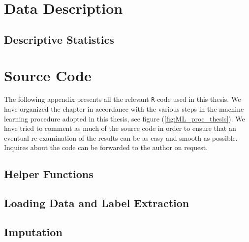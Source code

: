 \documentclass[../thesis.tex]{subfiles}
\begin{document}
\appendix

\chapter{Data Description}
\label{chap:data_desc}

\section{Descriptive Statistics}

\chapter{Source Code}
\label{chap:souce_code}

\noindent The following appendix presents all the relevant \texttt{R}-code used in this thesis. We have organized the chapter in accordance with the various steps in the machine learning procedure adopted in this thesis, see figure (\ref{fig:ML_proc_thesis}). We have tried to comment as much of the source code in order to ensure that an eventual re-examination of the results can be as easy and smooth as possible. Inquires about the code can be forwarded to the author on request.

\section{Helper Functions}
\label{sec:helper_func}



\section{Loading Data and Label Extraction}
\label{sec:load_data}



\section{Imputation}
\end{document}
